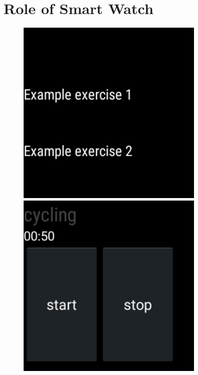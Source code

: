 \section{Role of Smart Watch}

\begin{figure}[b!]
  \centering
    \begin{minipage}{0.20\textwidth}
      \centering
        \includegraphics[width=0.80\textwidth]{00_resources/figures/Android_Watch_ListView.png}
    \end{minipage}
    \begin{minipage}{0.20\textwidth}
      \centering
        \includegraphics[width=0.80\textwidth]{00_resources/figures/Android_Watch_RecordView.png}

\end{minipage}
\end{figure}

